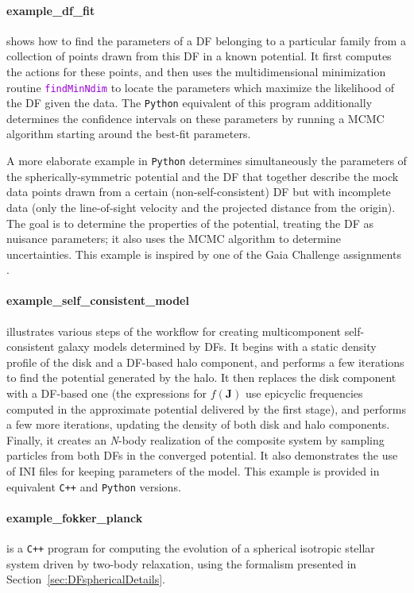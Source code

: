 \documentclass[12pt]{article}
\newcommand{\Nbody}{\textsl{N}-body\xspace}
\newcommand{\Cpp}  {\texttt{C++}\xspace}
\newcommand{\Python}{\texttt{Python}\xspace}
\newcommand{\ttt}[1]{\textcolor{darkviolet}{\texttt{#1}}}
\newcommand{\bJ}{\boldsymbol{J}}
\begin{document}
\paragraph{example_df_fit} shows how to find the parameters of a DF belonging to a particular family from a collection of points drawn from this DF in a known potential. It first computes the actions for these points, and then uses the multidimensional minimization routine \ttt{findMinNdim} to locate the parameters which maximize the likelihood of the DF given the data.
The \Python equivalent of this program additionally determines the confidence intervals on these parameters by running a MCMC algorithm starting around the best-fit parameters.

A more elaborate example in \Python determines simultaneously the parameters of the spherically-symmetric potential and the DF that together describe the mock data points drawn from a certain (non-self-consistent) DF but with incomplete data (only the line-of-sight velocity and the projected distance from the origin). The goal is to determine the properties of the potential, treating the DF as nuisance parameters; it also uses the MCMC algorithm to determine uncertainties. 
This example is inspired by one of the Gaia Challenge assignments \cite{Read2017}.

\paragraph{example_self_consistent_model} illustrates various steps of the workflow for creating multicomponent self-consistent galaxy models determined by DFs. It begins with a static density profile of the disk and a DF-based halo component, and performs a few iterations to find the potential generated by the halo. It then replaces the disk component with a DF-based one (the expressions for $f(\bJ)$ use epicyclic frequencies computed in the approximate potential delivered by the first stage), and performs a few more iterations, updating the density of both disk and halo components. Finally, it creates an \Nbody realization of the composite system by sampling particles from both DFs in the converged potential. It also demonstrates the use of INI files for keeping parameters of the model. This example is provided in equivalent \Cpp and \Python versions.

\paragraph{example_fokker_planck} is a \Cpp program for computing the evolution of a spherical isotropic stellar system driven by two-body relaxation, using the formalism presented in Section~\ref{sec:DFsphericalDetails}.
\end{document}
